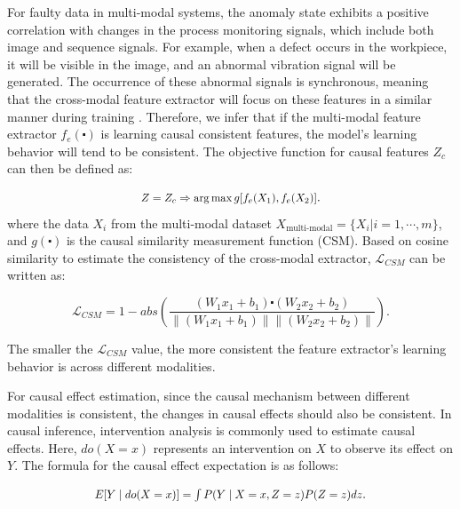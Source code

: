 \documentclass[preprint,12pt]{elsarticle}
\begin{document}
For faulty data in multi-modal systems, the anomaly state exhibits a positive correlation with changes in the process monitoring signals, which include both image and sequence signals. For example, when a defect occurs in the workpiece, it will be visible in the image, and an abnormal vibration signal will be generated. The occurrence of these abnormal signals is synchronous, meaning that the cross-modal feature extractor will focus on these features in a similar manner during training \cite{RN343}. Therefore, we infer that if the multi-modal feature extractor ${{f}_{e}}(\centerdot )$ is learning causal consistent features, the model's learning behavior will tend to be consistent. The objective function for causal features ${{Z}_{c}}$ can then be defined as:

\begin{equation}
  \scalebox{0.9}{$
    Z={{Z}_{c}}\Rightarrow \arg \max g[{{f}_{e}}({{X}_{1}}),{{f}_{e}}({{X}_{2}})]$}.
  \label{eq4}
\end{equation}
where the data ${{X}_{i}}$ from the multi-modal dataset ${{X}_{\text{multi-modal}}}=\{{{X}_{i}}|i=1,\cdots ,m\}$, and $g(\centerdot )$ is the causal similarity measurement function (CSM). Based on cosine similarity to estimate the consistency of the cross-modal extractor, ${{\mathcal{L}}_{CSM}}$ can be written as:

\begin{equation}
  {{\mathcal{L}}_{CSM}}=1-abs(\frac{({{W}_{1}}{{x}_{1}}+{{b}_{1}})\centerdot ({{W}_{2}}{{x}_{2}}+{{b}_{2}})}{\left\| ({{W}_{1}}{{x}_{1}}+{{b}_{1}}) \right\|\left\| ({{W}_{2}}{{x}_{2}}+{{b}_{2}}) \right\|}).
  \label{eq5}
\end{equation}

The smaller the ${{\mathcal{L}}_{CSM}}$ value, the more consistent the feature extractor's learning behavior is across different modalities.

For causal effect estimation, since the causal mechanism between different modalities is consistent, the changes in causal effects should also be consistent. In causal inference, intervention analysis is commonly used to estimate causal effects. Here, $do(X=x)$ represents an intervention on $X$ to observe its effect on $Y$. The formula for the causal effect expectation is as follows:

\begin{equation}
  \scalebox{0.9}{$
  E[Y\mid do(X=x)]=\int P(Y\mid X=x,Z=z)P(Z=z)dz$}.
  \label{eq6}
\end{equation}
\end{document}
